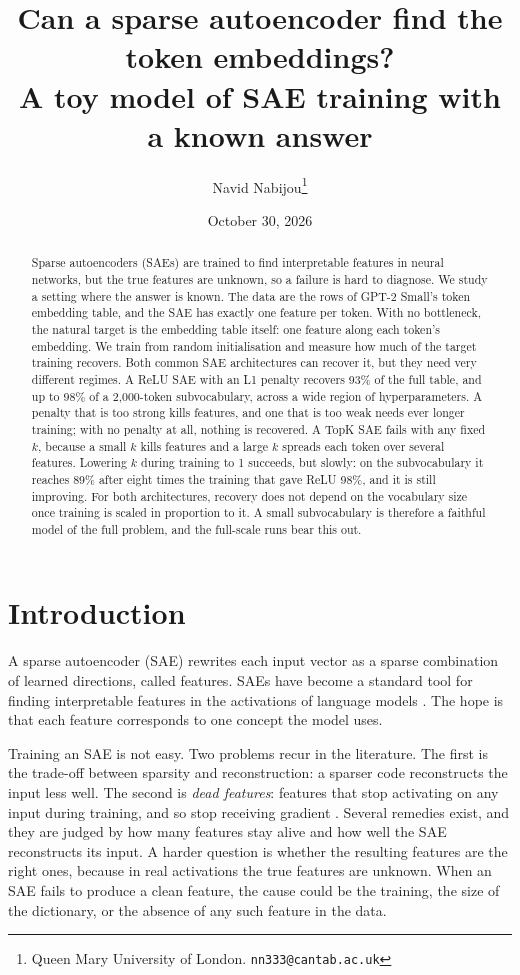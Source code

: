 \documentclass[11pt]{article}
\title{Can a sparse autoencoder find the token embeddings?\\[2pt]
\large A toy model of SAE training with a known answer}
\author{Navid Nabijou\thanks{Queen Mary University of London. \texttt{nn333@cantab.ac.uk}}}
\date{October 30, 2026}
\begin{document}
\maketitle

\begin{abstract}
Sparse autoencoders (SAEs) are trained to find interpretable features in neural networks, but the true features are unknown, so a failure is hard to diagnose. We study a setting where the answer is known. The data are the rows of GPT-2 Small's token embedding table, and the SAE has exactly one feature per token. With no bottleneck, the natural target is the embedding table itself: one feature along each token's embedding. We train from random initialisation and measure how much of the target training recovers. Both common SAE architectures can recover it, but they need very different regimes. A ReLU SAE with an L1 penalty recovers 93\% of the full table, and up to 98\% of a 2,000-token subvocabulary, across a wide region of hyperparameters. A penalty that is too strong kills features, and one that is too weak needs ever longer training; with no penalty at all, nothing is recovered. A TopK SAE fails with any fixed $k$, because a small $k$ kills features and a large $k$ spreads each token over several features. Lowering $k$ during training to 1 succeeds, but slowly: on the subvocabulary it reaches 89\% after eight times the training that gave ReLU 98\%, and it is still improving. For both architectures, recovery does not depend on the vocabulary size once training is scaled in proportion to it. A small subvocabulary is therefore a faithful model of the full problem, and the full-scale runs bear this out.
\end{abstract}

\section{Introduction}

A sparse autoencoder (SAE) rewrites each input vector as a sparse combination of learned directions, called features. SAEs have become a standard tool for finding interpretable features in the activations of language models \cite{cunningham2023sparse,bricken2023monosemanticity,templeton2024scaling,gao2024scaling}. The hope is that each feature corresponds to one concept the model uses.

Training an SAE is not easy. Two problems recur in the literature. The first is the trade-off between sparsity and reconstruction: a sparser code reconstructs the input less well. The second is \emph{dead features}: features that stop activating on any input during training, and so stop receiving gradient \cite{bricken2023monosemanticity,gao2024scaling}. Several remedies exist, and they are judged by how many features stay alive and how well the SAE reconstructs its input. A harder question is whether the resulting features are the right ones, because in real activations the true features are unknown. When an SAE fails to produce a clean feature, the cause could be the training, the size of the dictionary, or the absence of any such feature in the data.
\end{document}
